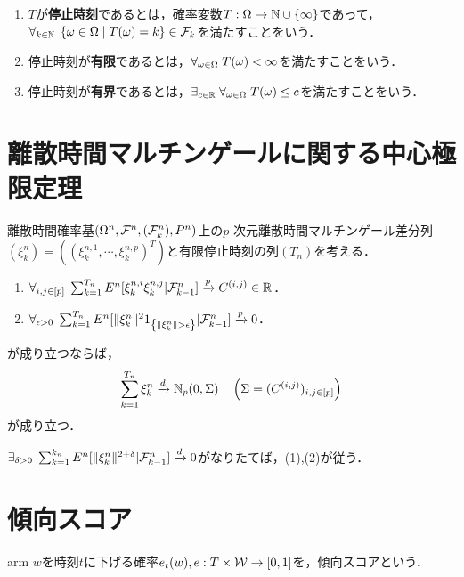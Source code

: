 \documentclass[uplatex,dvipdfmx]{jsreport}
\begin{document}
\begin{definition}\mbox{}
    \begin{enumerate}
        \item $T$が\textbf{停止時刻}であるとは，確率変数$T:\Omega\to\mathbb{N}\cup\{\infty\}$であって，$\forall_{k\in\mathbb{N}}\;\left\{\omega\in\Omega\mid T(\omega)=k\right\}\in\mathcal{F}_k$を満たすことをいう．
        \item 停止時刻が\textbf{有限}であるとは，$\forall_{\omega\in\Omega}\;T(\omega)<\infty$を満たすことをいう．
        \item 停止時刻が\textbf{有界}であるとは，$\exists_{c\in\mathbb{R}}\;\forall_{\omega\in\Omega}\;T(\omega)\le c$を満たすことをいう．
    \end{enumerate}
\end{definition}

\section{離散時間マルチンゲールに関する中心極限定理}

\begin{theorem}
    離散時間確率基$(\Omega^n,\mathcal{F}^n,(\mathcal{F}^n_k),P^n)$上の$p$-次元離散時間マルチンゲール差分列$(\xi^n_k)=((\xi^{n,1}_k,\cdots,\xi^{n,p}_k)^T)$と有限停止時刻の列$(T_n)$を考える．
    \begin{enumerate}
        \item $\forall_{i,j\in[p]}\;\sum^{T_n}_{k=1}E^n[\xi^{n,i}_k\xi^{n,j}_k|\mathcal{F}^n_{k-1}]\xrightarrow{p}C^{(i,j)}\in\mathbb{R}$．
        \item $\forall_{\ep>0}\;\sum^{T_n}_{k=1}E^n[\norm{\xi^n_k}^21_{\Brace{\norm{\xi^n_k}>\ep}}|\F^n_{k-1}]\xrightarrow{p}0$．
    \end{enumerate}
    が成り立つならば，
    \[\sum^{T_n}_{k=1}\xi^n_k\xrightarrow{d}\mathbb{N}_p(0,\Sigma)\quad\left(\Sigma=(C^{(i,j)})_{i,j\in[p]}\right)\]
    が成り立つ．
\end{theorem}

\begin{lemma}
    $\exists_{\delta>0}\;\sum^{k_n}_{k=1}E^n[\|\xi^n_k\|^{2+\delta}|\mathcal{F}^n_{k-1}]\xrightarrow{d}0$がなりたてば，(1),(2)が従う．
\end{lemma}

\section{傾向スコア}

\begin{tcolorbox}[colframe=ForestGreen, colback=ForestGreen!10!white,breakable,colbacktitle=ForestGreen!40!white,coltitle=black,fonttitle=\bfseries\sffamily,
title=]
    arm $w$を時刻$t$に下げる確率$e_t(w),e:T\times\mathcal{W}\to[0,1]$を，傾向スコアという．
\end{tcolorbox}
\end{document}
